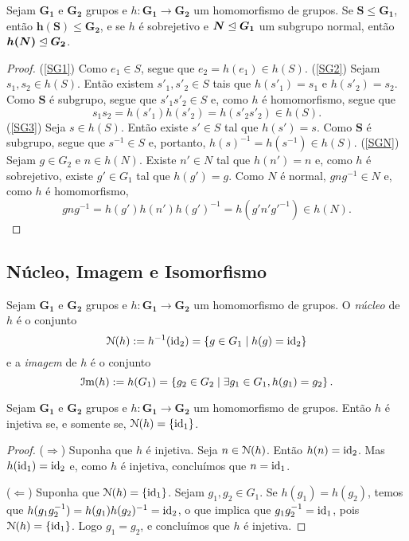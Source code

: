 \begin{prop}
\label{alge:prop.gru.hom}
Sejam $\bm{G_1}$ e $\bm{G_2}$ grupos e $h: \bm{G_1} \to \bm{G_2}$ um homomorfismo de grupos. Se $\bm S \leq \bm{G_1}$, então $\bm{h(S)} \leq \bm{G_2}$, e se $h$ é sobrejetivo e $\bm N \mathrel{\unlhd} \bm{G_1}$ um subgrupo normal, então $\bm{h(N)} \mathrel{\unlhd} \bm{G_2}$.
\end{prop}
\begin{proof}
(\ref{SG1}) Como $e_1 \in S$, segue que $e_2=h(e_1) \in h(S)$.
(\ref{SG2}) Sejam $s_1,s_2 \in h(S)$. Então existem $s'_1,s'_2 \in S$ tais que $h(s'_1)=s_1$ e $h(s'_2)=s_2$. Como $\bm S$ é subgrupo, segue que $s'_1s'_2 \in S$ e, como $h$ é homomorfismo, segue que
	\begin{equation*}
	s_1s_2 = h(s'_1)h(s'_2) = h(s'_2s'_2) \in h(S).
	\end{equation*}
(\ref{SG3}) Seja $s \in h(S)$. Então existe $s' \in S$ tal que $h(s')=s$. Como $\bm S$ é subgrupo, segue que $s^{-1} \in S$ e, portanto, $h(s)^{-1} = h(s^{-1}) \in h(S)$. (\ref{SGN}) Sejam $g \in G_2$ e $n \in h(N)$. Existe $n' \in N$ tal que $h(n')=n$ e, como $h$ é sobrejetivo, existe $g' \in G_1$ tal que $h(g')=g$. Como $N$ é normal, $gng^{-1} \in N$ e, como $h$ é homomorfismo,
	\begin{equation*}
	gng^{-1} = h(g')h(n')h(g')^{-1} = h(g'n'g'^{-1}) \in h(N).
	\end{equation*}
\end{proof}

\subsection{Núcleo, Imagem e Isomorfismo}

\begin{defi}
Sejam $\bm{G_1}$ e $\bm{G_2}$ grupos e $h: \bm{G_1} \to \bm{G_2}$ um homomorfismo de grupos. O \emph{núcleo} de $h$ é o conjunto
	\begin{equation*}
	\mathcal{N}(h) := h^{-1}(\mathrm{id}_2) = \left\{g \in G_1 \;\middle\vert\; h(g) = \mathrm{id}_2 \right\}
	\end{equation*}
e a \emph{imagem} de $h$ é o conjunto
	\begin{equation*}
	\mathcal{I}\mathrm{m}(h) := h(G_1) = \left\{g_2 \in G_2 \;\middle\vert\; \exists g_1 \in G_1, h(g_1) = g_2 \right\}.
	\end{equation*}
\end{defi}

\begin{prop}
\label{pro:gru.nuc.inj}
Sejam $\bm{G_1}$ e $\bm{G_2}$ grupos e $h: \bm{G_1} \to \bm{G_2}$ um homomorfismo de grupos. Então $h$ é injetiva se, e somente se, $\mathcal{N}(h)=\{\mathrm{id}_1\}$.
\end{prop}
\begin{proof}
($\Rightarrow$)	Suponha que $h$ é injetiva. Seja $n \in \mathcal{N}(h)$. Então $h(n)=\mathrm{id}_2$. Mas $h(\mathrm{id}_1)=\mathrm{id}_2$ e, como $h$ é injetiva, concluímos que $n=\mathrm{id}_1$.

\noindent
($\Leftarrow$) Suponha que $\mathcal{N}(h)=\{\mathrm{id}_1\}$. Sejam $g_1,g_2 \in G_1$. Se $h(g_1)=h(g_2)$, temos que $h(g_1 g_2^{-1}) = h(g_1) h(g_2)^{-1} = \mathrm{id}_2$, o que implica que $g_1 g_2^{-1} = \mathrm{id}_1$, pois $\mathcal{N}(h)=\{\mathrm{id}_1\}$. Logo $g_1=g_2$, e concluímos que $h$ é injetiva.
\end{proof}

